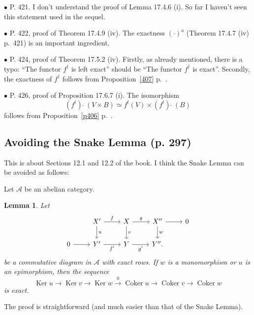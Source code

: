 \documentclass[12pt]{article}
\newtheorem{lem}[thm]{Lemma}
\theoremstyle{remark}%
\newcommand{\bu}{\bullet}
\newcommand{\n}{\noindent}
\newcommand{\A}{\mathcal A}
\newcommand{\xr}{\xrightarrow}
\DeclareMathOperator{\Coker}{Coker}
\DeclareMathOperator{\Ker}{Ker}
\begin{document}

\n$\bu$ P. 421. I don't understand the proof of Lemma 17.4.6 (i). So far I haven't seen this statement used in the sequel.


\n$\bu$ P. 422, proof of Theorem 17.4.9 (iv). The exactness $(\cdot)^a$ (Theorem 17.4.7 (iv) p.~421) is an important ingredient.


\n$\bu$ P. 424, proof of Theorem 17.5.2 (iv). Firstly, as already mentioned, there is a typo: ``The functor $f^\dagger$ is left exact'' should be ``The functor $f^\dagger$ is exact''. Secondly, the exactness of $f^\dagger$ follows from Proposition~\ref{407} p.~\pageref{407}.


\n$\bu$ P. 426, proof of Proposition 17.6.7 (i). The isomorphism 
$$
(f^t)\ \widehat{}\ (V\times B)\simeq f^t(V)\times(f^t)\ \widehat{}\ (B)
$$ 
follows from Proposition~\ref{p406} p.~\pageref{p406}.
%
\subsection{Avoiding the Snake Lemma (p. 297)} %
%
This is about Sections 12.1 and 12.2 of the book. I think the Snake Lemma can be avoided as follows: 

Let $\A$ be an abelian category. 
%
\begin{lem}\label{sl1}
Let  
$$
\begin{tikzcd}
{}&X'\ar{d}{u}\ar{r}{f}&X\ar{d}{v}\ar{r}{g}&X''\ar{d}{w}\ar{r}&0\\ 
0\ar{r}&Y'\ar{r}[swap]{f'}&Y\ar{r}[swap]{g'}&Y''.
\end{tikzcd}
$$ 
be a commutative diagram in $\A$ with exact rows. If $w$ is a monomorphism or $u$ is an epimorphism, then the sequence  
$$
\Ker u\to\Ker v\to\Ker w\xr0\Coker u\to\Coker v\to\Coker w
$$
is exact.
\end{lem}
%
The proof is straightforward (and much easier than that of the Snake Lemma). 
\end{document}
